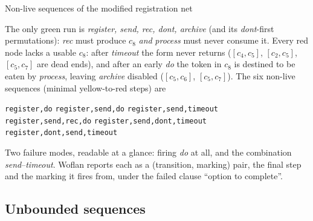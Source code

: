 \begin{examplebox}{Non-live sequences of the modified registration net}
\begin{center}
\end{center}
The only green run is \emph{register, send, rec, dont, archive} (and its \emph{dont}-first permutations): \emph{rec} must produce $c_8$ \emph{and} \emph{process} must never consume it. Every red node lacks a usable $c_8$: after \emph{timeout} the form never returns ($[c_4,c_5]$, $[c_2,c_5]$, $[c_5,c_7]$ are dead ends), and after an early \emph{do} the token in $c_8$ is destined to be eaten by \emph{process}, leaving \emph{archive} disabled ($[c_5,c_6]$, $[c_5,c_7]$). The six non-live sequences (minimal yellow-to-red steps) are
\begin{center}
\texttt{register,do} \quad \texttt{register,send,do} \quad \texttt{register,send,timeout}\\
\texttt{register,send,rec,do} \quad \texttt{register,send,dont,timeout} \quad \texttt{register,dont,send,timeout}
\end{center}
Two failure modes, readable at a glance: firing \emph{do} at all, and the combination \emph{send}--\emph{timeout}. Woflan reports each as a (transition, marking) pair, the final step and the marking it fires from, under the failed clause ``option to complete''.
\end{examplebox}

\subsection{Unbounded sequences}

